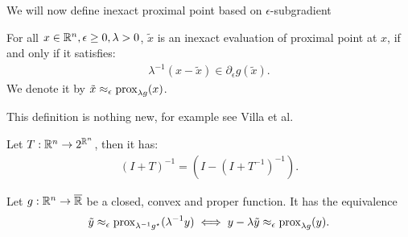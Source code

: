 \documentclass[12pt]{article}
\begin{document}
        We will now define inexact proximal point based on $\epsilon$-subgradient
        \begin{definition}\label{def:inxt-pp}
            For all $x \in \mathbb R^n, \epsilon \ge 0, \lambda > 0$, $\tilde x$ is an inexact evaluation of proximal point at $x$, if and only if it satisfies: 
            \begin{align*}
                \lambda^{-1}(x - \tilde x) \in \partial_{\epsilon} g(\tilde x). 
            \end{align*}
            We denote it by $\tilde x \approx_\epsilon \operatorname{prox}_{\lambda g}(x)$. 
        \end{definition}
        \begin{remark}
            This definition is nothing new, for example see Villa et al. \cite[Definition 2.1]{villa_accelerated_2013}
        \end{remark}
        \begin{fact}\label{fact:resv-identity}
            Let $T: \mathbb R^n \rightarrow 2^{\mathbb R^n}$, then it has: 
            \begin{align*}
                (I + T)^{-1} = (I - (I + T^{-1})^{-1}).
            \end{align*}
        \end{fact}
        \begin{theorem}
            Let $g: \mathbb R^n \rightarrow \overline {\mathbb R}$ be a closed, convex and proper function. 
            It has the equivalence
            \begin{align*}
                \tilde y \approx_\epsilon \operatorname{prox}_{\lambda^{-1}g^\star}(\lambda^{-1}y)
                \iff 
                y - \lambda \tilde y \approx_\epsilon \operatorname{prox}_{\lambda g}(y). 
            \end{align*}
        \end{theorem}
\end{document}
